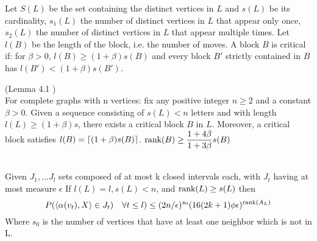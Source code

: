 Let $S(L)$ be the set containing the distinct vertices in $L$ and $s(L)$ be its cardinality, $s_1(L)$ the number of distinct vertices in $L$ that appear only once, $s_2(L)$ the number of distinct vertices in $L$ that appear multiple times. Let $l(B)$ be the length of the block, i.e. the number of moves.
A block $B$ is critical if: for $\beta > 0$, $l(B) \geq (1 + \beta)s(B)$ and every block $B'$ strictly contained in $B$ has $l(B') < (1+\beta)s(B')$.

\begin{lemma}
\label{critical}
(Lemma 4.1 \cite{angel2016local}) \\
For complete graphs with n vertices: fix any positive integer $n \geq 2$ and a constant $\beta > 0$. Given a sequence consisting of $s(L) < n$ letters and with length $l(L) \geq (1 +\beta)s$, there exists a critical block $B$ in $L$. Moreover, a critical block satisfies $l(B) = \lceil(1 + \beta)s(B)\rceil$.
$\text{rank}(B) \geq \dfrac{1+4\beta}{1 + 3\beta}s(B)$
\end{lemma} 

\begin{lemma} \leavevmode \\
\label{lem::boundN}
Given $J_1, ... J_l$ sets composed of at most k closed intervals each, with $J_t$ having at most measure $\epsilon$
If $l(L) = l, s(L) < n$, and $\text{rank}(L) \geq s(L)$ then \\
\begin{equation*}
P(\langle \alpha(v_t), X \rangle \in J_t) \quad \forall t\leq l)  \leq (2n/\epsilon)^{s_0}(16(2k+1)\phi\epsilon)^{\text{rank}(A_L)}
\end{equation*}
Where $s_0$ is the number of vertices that have at least one neighbor which is not in L. 
\end{lemma}

